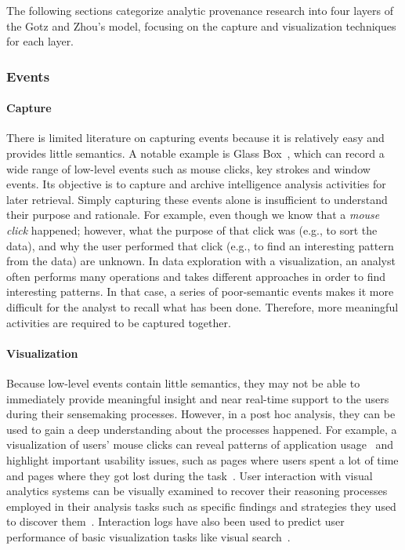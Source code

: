 The following sections categorize analytic provenance research into four layers of the Gotz and Zhou's model, focusing on the capture and visualization techniques for each layer.

\subsubsection{Events}

\paragraph{Capture}
There is limited literature on capturing events because it is relatively easy and provides little semantics. A notable example is Glass Box~\cite{Cowley2006}, which can record a wide range of low-level events such as mouse clicks, key strokes and window events. Its objective is to capture and archive intelligence analysis activities for later retrieval. Simply capturing these events alone is insufficient to understand their purpose and rationale. For example, even though we know that a \textit{mouse click} happened; however, what the purpose of that click was (e.g., to sort the data), and why the user performed that click (e.g., to find an interesting pattern from the data) are unknown. In data exploration with a visualization, an analyst often performs many operations and takes different approaches in order to find interesting patterns. In that case, a series of poor-semantic events makes it more difficult for the analyst to recall what has been done. Therefore, more meaningful activities are required to be captured together. 

\paragraph{Visualization}
Because low-level events contain little semantics, they may not be able to immediately provide meaningful insight and near real-time support to the users during their sensemaking processes. However, in a post hoc analysis, they can be used to gain a deep understanding about the processes happened. For example, a visualization of users' mouse clicks can reveal patterns of application usage~\cite{Matejka2013} and highlight important usability issues, such as pages where users spent a lot of time and pages where they got lost during the task~\cite{Waterson2002}. User interaction with visual analytics systems can be visually examined to recover their reasoning processes employed in their analysis tasks such as specific findings and strategies they used to discover them~\cite{Dou2009, Guo2016}. Interaction logs have also been used to predict user performance of basic visualization tasks like visual search~\cite{Brown2014}.

